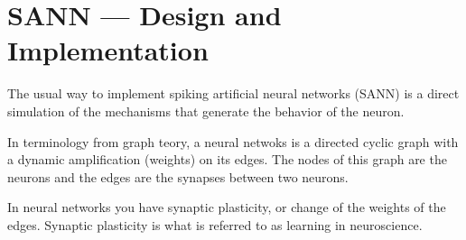 

%













\section{SANN --- Design and Implementation}
\label{secSANN} 


	The usual way to implement spiking artificial neural networks (SANN) is a direct simulation of the mechanisms that generate the behavior of the neuron.
	
	In terminology from graph teory, a neural netwoks is a directed cyclic graph with a dynamic amplification (weights) on its edges.
	The nodes of this graph are the neurons and the edges are the synapses between two neurons.%

	In neural networks you have synaptic plasticity, or change of the weights of the edges. Synaptic plasticity is what is referred to as learning in neuroscience. %


